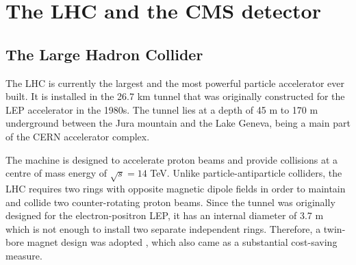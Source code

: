 \chapter{The LHC and the CMS detector}
\ifpdf
    \graphicspath{{03_Detector/plots/}}
\else
    \graphicspath{{03_Detector/plots/EPS/}{03_Detector/plots/}}
\fi

\section{The Large Hadron Collider}
The LHC \cite{LHC} is currently the largest and the most powerful particle accelerator ever built. It is installed in
the 26.7 km tunnel that was originally constructed for the LEP accelerator in the 1980s. The tunnel lies at a depth of
45 m to 170 m underground between the Jura mountain and the Lake Geneva, being a main part of the CERN accelerator
complex.

The machine is designed to accelerate proton beams and provide collisions at a centre of mass energy of $\sqrt s = 14$
TeV. Unlike particle-antiparticle colliders, the LHC requires two rings with opposite magnetic dipole fields in order to
maintain and collide two counter-rotating proton beams. Since the tunnel was originally designed for the
electron-positron LEP, it has an internal diameter of 3.7 m which is not enough to install two separate independent
rings. Therefore, a twin-bore magnet design was adopted \cite{Blewett}, which also came as a substantial cost-saving
measure.

